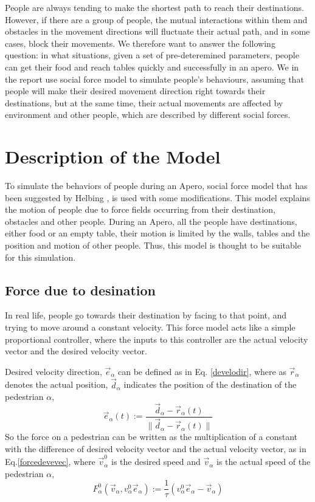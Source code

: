 \documentclass[11pt]{article}
\begin{document}
People are always tending to make the shortest path to reach their destinations. However, if there are a group of people, the mutual interactions within them and obstacles in the movement directions will fluctuate their actual path, and in some cases, block their movements. We therefore want to answer the following question: in what situations, given a set of pre-deteremined parameters, people can get their food and reach tables quickly and successfully in an apero. We in the report use social force model to simulate people's behaviours, assuming that people will make their desired movement direction right towards their destinations, but at the same time, their actual movements are affected by environment and other people, which are described by different social forces.
\section{Description of the Model}
To simulate the behaviors of people during an Apero, social force model that has been suggested by Helbing \citep{Socialforce}, is used with some modifications. This model explains the motion of people due to force fields occurring from their destination, obstacles and other people. During an Apero, all the people have destinations, either food or an empty table, their motion is limited by the walls, tables and the position and motion of other people. Thus, this model is thought to be suitable for this simulation.
\subsection{Force due to desination}
In real life, people go towards their destination by facing to that point, and trying to move around a constant velocity. This force model acts like a simple proportional controller, where the inputs to this controller are the actual velocity vector and the desired velocity vector.

Desired velocity direction, $\vec{e}_\alpha$ can be defined as in Eq. \ref{develodir}, where as $\vec{r}_\alpha$ denotes the actual position,  $\vec{d}_\alpha$ indicates the position of the destination of the pedestrian $\alpha$,
\begin{equation}
    \vec{e}_\alpha(t):=\frac{\vec{d}_\alpha-\vec{r}_\alpha(t)}{\| \vec{d}_\alpha-\vec{r}_\alpha(t) \|}
\label{develodir}
\end{equation}
So the force on a pedestrian can be written as the multiplication of a constant with the difference of desired velocity vector and the actual velocity vector, as in Eq.\ref{forcedevevec}, where $\vec{v}_\alpha^0$ is the desired speed and $\vec{v}_\alpha$ is the actual speed of the pedestrian $\alpha$,
\begin{equation}
    F_\alpha^0(\vec{v}_\alpha,v_\alpha^0\vec{e}_\alpha) := \frac{1}{\tau}(v_\alpha^0\vec{e}_\alpha-\vec{v}_\alpha)
\label{forcedevevec}
\end{equation}
\end{document}

